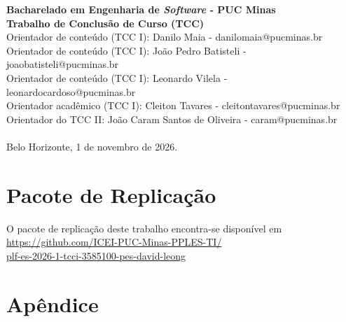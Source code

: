 \documentclass[12pt]{article}
\begin{document}
\begin{tcolorbox}
\footnotesize
\textbf{Bacharelado em Engenharia de \emph{Software} - PUC Minas\\
Trabalho de Conclusão de Curso (TCC)} \\

\indent Orientador de conteúdo (TCC I): Danilo Maia - danilomaia@pucminas.br \\
Orientador de conteúdo (TCC I): João Pedro Batisteli - joaobatisteli@pucminas.br\\
Orientador de conteúdo (TCC I): Leonardo Vilela - leonardocardoso@pucminas.br \\
Orientador acadêmico (TCC I): Cleiton Tavares - cleitontavares@pucminas.br \\
Orientador do TCC II: João Caram Santos de Oliveira - caram@pucminas.br\\ \\
Belo Horizonte, 1 de novembro de 2026.
\end{tcolorbox}










\vspace{-2mm}
\section*{Pacote de Replicação}
\vspace{-1mm}
\footnotesize
O pacote de replicação deste trabalho encontra-se disponível em\\
\url{https://github.com/ICEI-PUC-Minas-PPLES-TI/}\\
\url{plf-es-2026-1-tcci-3585100-pes-david-leong}
\normalsize

\FloatBarrier




\section*{Apêndice}
\appendix

\end{document}
